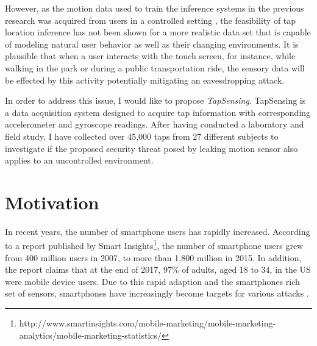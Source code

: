 However, as the motion data used to train the inference systems in the previous research was acquired from users in a controlled setting \cite{Tapprints, Touchlogger, Accessory}, the feasibility of tap location inference has not been shown for a more realistic data set that is capable of modeling natural user behavior as well as their changing environments. It is plausible that when a user interacts with the touch screen, for instance, while walking in the park or during a public transportation ride, the sensory data will be effected by this activity potentially mitigating an eavesdropping attack.

In order to address this issue, I would like to propose \textit{TapSensing}. TapSensing is a data acquisition system designed to acquire tap information with corresponding accelerometer and gyroscope readings. After having conducted a laboratory and field study, I have collected over 45,000 taps from 27 different subjects to investigate if the proposed security threat posed by leaking motion sensor also applies to an uncontrolled environment.


\section{Motivation}

In recent years, the number of smartphone users has rapidly
increased. According to a report published by Smart
Insights\footnote{http://www.smartinsights.com/mobile-marketing/mobile-marketing-analytics/mobile-marketing-statistics/}, the number of smartphone users grew from 400 million users in 2007, to more than 1,800 million in 2015. In addition, the report claims that at the end of 2017, 97\% of adults, aged 18 to 34, in the US were mobile device users. Due to this rapid adaption and the smartphones rich set of sensors, smartphones have increasingly become targets for various attacks \cite{Colp:2015:PDS:2694344.2694380, Aviv:2010:SAS:1925004.1925009, Touchlogger}.

